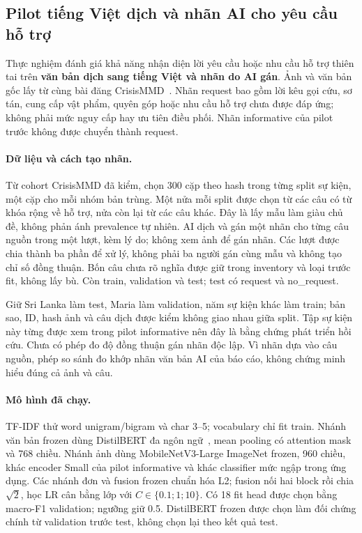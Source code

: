 \subsection{Pilot tiếng Việt dịch và nhãn AI cho yêu cầu hỗ trợ}\label{sec:vi-silver-pilot}
Thực nghiệm đánh giá khả năng nhận diện lời yêu cầu hoặc nhu cầu hỗ trợ thiên tai trên \textbf{văn bản dịch sang tiếng Việt và nhãn do AI gán}. Ảnh và văn bản gốc lấy từ cùng bài đăng CrisisMMD~\citep{alam2018crisismmd}. Nhãn request bao gồm lời kêu gọi cứu, sơ tán, cung cấp vật phẩm, quyên góp hoặc nhu cầu hỗ trợ chưa được đáp ứng; không phải mức nguy cấp hay ưu tiên điều phối. Nhãn informative của pilot trước không được chuyển thành request.

\paragraph{Dữ liệu và cách tạo nhãn.} Từ cohort CrisisMMD đã kiểm, chọn 300 cặp theo hash trong từng split sự kiện, một cặp cho mỗi nhóm bản trùng. Một nửa mỗi split được chọn từ các câu có từ khóa rộng về hỗ trợ, nửa còn lại từ các câu khác. Đây là lấy mẫu làm giàu chủ đề, không phản ánh prevalence tự nhiên. AI dịch và gán một nhãn cho từng câu nguồn trong một lượt, kèm lý do; không xem ảnh để gán nhãn. Các lượt được chia thành ba phần để xử lý, không phải ba người gán cùng mẫu và không tạo chỉ số đồng thuận. Bốn câu chưa rõ nghĩa được giữ trong inventory và loại trước fit, không lấy bù. Còn \VISilverTrainN{} train, \VISilverDevN{} validation và \VISilverTestN{} test; test có \VISilverPositiveN{} request và \VISilverNegativeN{} no\_request.

Giữ Sri Lanka làm test, Maria làm validation, năm sự kiện khác làm train; bản sao, ID, hash ảnh và câu dịch được kiểm không giao nhau giữa split. Tập sự kiện này từng được xem trong pilot informative nên đây là bằng chứng phát triển hồi cứu. Chưa có phép đo độ đồng thuận gán nhãn độc lập. Vì nhãn dựa vào câu nguồn, phép so sánh đo khớp nhãn văn bản AI của báo cáo, không chứng minh hiểu đúng cả ảnh và câu.

\paragraph{Mô hình đã chạy.} TF-IDF thử word unigram/bigram và char 3--5; vocabulary chỉ fit train. Nhánh văn bản frozen dùng DistilBERT đa ngôn ngữ~\citep{sanh2019distilbert,distilbertMultilingualCard}, mean pooling có attention mask và 768 chiều. Nhánh ảnh dùng MobileNetV3-Large ImageNet frozen, 960 chiều, khác encoder Small của pilot informative và khác classifier mức ngập trong ứng dụng. Các nhánh đơn và fusion frozen chuẩn hóa L2; fusion nối hai block rồi chia $\sqrt{2}$, học LR cân bằng lớp với $C\in\{0.1;1;10\}$. Có 18 fit head được chọn bằng macro-F1 validation; ngưỡng giữ 0.5. DistilBERT frozen được chọn làm đối chứng chính từ validation trước test, không chọn lại theo kết quả test.

